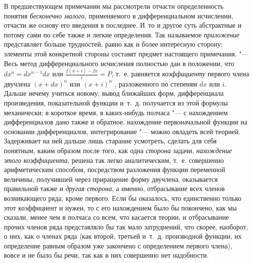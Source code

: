 В предшествующем примечании мы рассмотрели отчасти определенность понятия
{\em бесконечно малого}, применяемого в дифференциальном
исчислении, отчасти же основу его введения в последнее. И~то и другое суть
абстрактные и потому сами по себе также и легкие определения. Так
называемое {\em приложение} представляет больше
трудностей, равно как и более интересную сторону; элементы этой конкретной
стороны составят предмет настоящего примечания. "--- Весь метод
дифференциального исчисления полностью дан в положении, что 
$dx^n=dx^{n-1}dx$ или 
$\frac{f\left(x+i\right)-fx} i=P$, т.~е. равняется
{\em коэффициенту} первого члена двучлена 
$(x+dx)^n$ или $(x+i)^n$
, разложенного по степеням $dx$ или $i$. Дальше нечему
учиться новому; вывод ближайших форм, дифференциала произведения,
показательной функции и~т.~д. получается из этой формулы механически; в
короткое время, в каких-нибудь полчаса "--- с нахождением дифференциалов дано
также и обратное, нахождение первоначальной функции на основании
дифференциалов, интегрирование "--- можно овладеть всей теорией. Задерживает на
ней дальше лишь старание усмотреть, сделать для себя понятным, каким
образом после того, как одна {\em сторона} задачи,
{\em нахождение этого коэффициента}, решена так легко
аналитическим, т.~е. совершенно арифметическим способом, посредством
разложения функции переменной величины, получившей через приращение форму
двучлена, оказывается правильной также и {\em другая
сторона}, а именно, отбрасывание всех членов возникающего ряда, кроме
первого. Если бы оказалось, что единственно только этот коэффициент и нужен,
то с его нахождением было бы покончено, как мы сказали, менее чем в полчаса
со всем, что касается теории, и отбрасывание прочих членов ряда
представляло бы так мало затруднений, что скорее, наоборот, о них, как о
членах ряда (как второй, третьей и~т.~д. производной функции, их
определение равным образом уже закончено с определением первого члена),
вовсе и не было бы речи, так как в них совершенно нет надобности.

